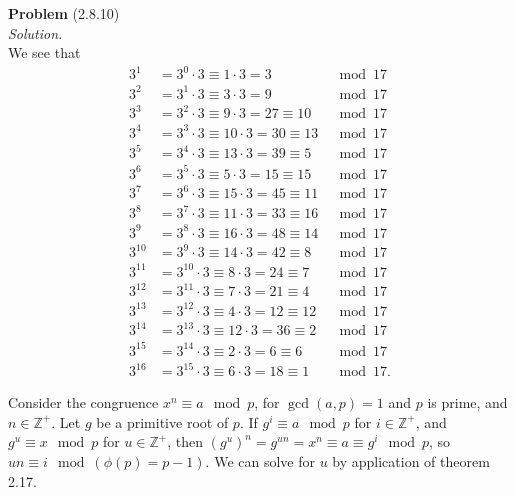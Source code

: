 \documentclass[12 pt]{amsart}
\begin{document}
\noindent
\textbf{Problem} (2.8.10) \\[4ex]
\emph{Solution.} \\[2ex]
  We see that
  \begin{align*}
    3^1    &= 3^0    \cdot 3 \equiv 1  \cdot 3 =  3           &\mod 17 \\
    3^2    &= 3^1    \cdot 3 \equiv 3  \cdot 3 =  9           &\mod 17 \\
    3^3    &= 3^2    \cdot 3 \equiv 9  \cdot 3 = 27 \equiv 10 &\mod 17 \\
    3^4    &= 3^3    \cdot 3 \equiv 10 \cdot 3 = 30 \equiv 13 &\mod 17 \\
    3^5    &= 3^4    \cdot 3 \equiv 13 \cdot 3 = 39 \equiv  5 &\mod 17 \\
    3^6    &= 3^5    \cdot 3 \equiv  5 \cdot 3 = 15 \equiv 15 &\mod 17 \\
    3^7    &= 3^6    \cdot 3 \equiv 15 \cdot 3 = 45 \equiv 11 &\mod 17 \\
    3^8    &= 3^7    \cdot 3 \equiv 11 \cdot 3 = 33 \equiv 16 &\mod 17 \\
    3^9    &= 3^8    \cdot 3 \equiv 16 \cdot 3 = 48 \equiv 14 &\mod 17 \\
    3^{10} &= 3^9    \cdot 3 \equiv 14 \cdot 3 = 42 \equiv  8 &\mod 17 \\
    3^{11} &= 3^{10} \cdot 3 \equiv  8 \cdot 3 = 24 \equiv  7 &\mod 17 \\
    3^{12} &= 3^{11} \cdot 3 \equiv  7 \cdot 3 = 21 \equiv  4 &\mod 17 \\
    3^{13} &= 3^{12} \cdot 3 \equiv  4 \cdot 3 = 12 \equiv 12 &\mod 17 \\
    3^{14} &= 3^{13} \cdot 3 \equiv 12 \cdot 3 = 36 \equiv  2 &\mod 17 \\
    3^{15} &= 3^{14} \cdot 3 \equiv  2 \cdot 3 =  6 \equiv  6 &\mod 17 \\
    3^{16} &= 3^{15} \cdot 3 \equiv  6 \cdot 3 = 18 \equiv  1 &\mod 17. 
  \end{align*}
  
  Consider the congruence $x^n \equiv a \mod p$, for $\gcd(a, p) = 1$ and
  $p$ is prime, and $n \in \mathbb{Z}^+$.
  Let $g$ be a primitive root of $p$. 
  If $g^i \equiv a \mod p$ for $i \in \mathbb{Z}^+$, and 
  $g^u \equiv x \mod p$ for $u \in \mathbb{Z}^+$, then 
  $\left( g^u \right)^n = g^{un} = x^n \equiv a \equiv g^i \mod p$, so
  $un \equiv i \mod (\phi(p) = p-1)$.
  We can solve for $u$ by application of theorem 2.17. 
\end{document}
